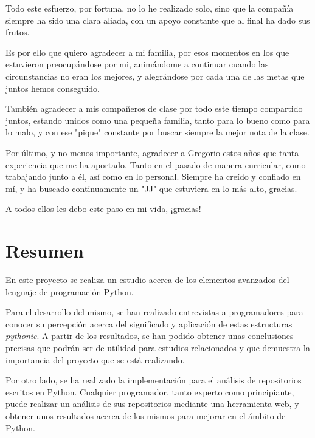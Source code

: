 \documentclass[a4paper, 12pt]{book}
\begin{document}
Todo este esfuerzo, por fortuna, no lo he realizado solo, sino que la compañía siempre ha sido una clara aliada, con un apoyo constante que al final ha dado sus frutos.

Es por ello que quiero agradecer a mi familia, por esos momentos en los que estuvieron preocupándose por mi, animándome a continuar cuando las circunstancias no eran los mejores, y alegrándose por cada una de las metas que juntos hemos conseguido.

También agradecer a mis compañeros de clase por todo este tiempo compartido juntos, estando unidos como una pequeña familia, tanto para lo bueno como para lo malo, y con ese "pique" constante por buscar siempre la mejor nota de la clase.

Por último, y no menos importante, agradecer a Gregorio estos años que tanta experiencia que me ha aportado. Tanto en el pasado de manera curricular, como trabajando junto a él, así como en lo personal. Siempre ha creído y confiado en mí, y ha buscado continuamente un "JJ" que estuviera en lo más alto, gracias.

A todos ellos les debo este paso en mi vida, ¡gracias!


\chapter*{Resumen}

En este proyecto se realiza un estudio acerca de los elementos avanzados del lenguaje de programación Python.

Para el desarrollo del mismo, se han realizado entrevistas a programadores para conocer su percepción acerca del significado y aplicación de estas estructuras \textit{pythonic}. A partir de los resultados, se han podido obtener unas conclusiones precisas que podrán ser de utilidad para estudios relacionados y que demuestra la importancia del proyecto que se está realizando.

Por otro lado, se ha realizado la implementación para el análisis de repositorios escritos en Python. Cualquier programador, tanto experto como principiante, puede realizar un análisis de sus repositorios mediante una herramienta web, y obtener unos resultados acerca de los mismos para mejorar en el ámbito de Python.
\end{document}
